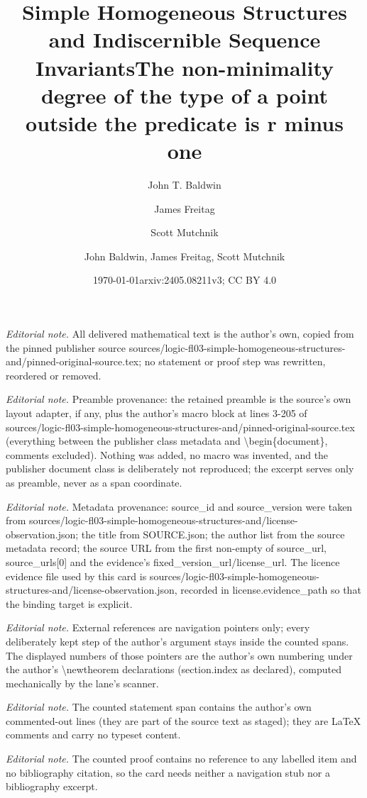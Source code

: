 \documentclass[10pt,a4paper]{amsart}
\title{Simple Homogeneous Structures and Indiscernible Sequence Invariants}
\author[1]{John T. Baldwin}
\author[2]{James Freitag}
\author[3]{Scott Mutchnik}
\date{\today}
\title{The non-minimality degree of the type of a point outside the predicate is r minus one}
\author{John Baldwin, James Freitag, Scott Mutchnik}
\date{arxiv:2405.08211v3; CC BY 4.0}
\theoremstyle{definition}
\theoremstyle{remark}
\numberwithin{equation}{section}
\begin{document}
\maketitle
\noindent\textit{Editorial note.} All delivered mathematical text is the author's own, copied from the pinned publisher source sources/logic-fl03-simple-homogeneous-structures-and/pinned-original-source.tex; no statement or proof step was rewritten, reordered or removed.\par\medskip
\noindent\textit{Editorial note.} Preamble provenance: the retained preamble is the source's own layout adapter, if any, plus the author's macro block at lines 3-205 of sources/logic-fl03-simple-homogeneous-structures-and/pinned-original-source.tex (everything between the publisher class metadata and \textbackslash{}begin\{document\}, comments excluded). Nothing was added, no macro was invented, and the publisher document class is deliberately not reproduced; the excerpt serves only as preamble, never as a span coordinate.\par\medskip
\noindent\textit{Editorial note.} Metadata provenance: source\_id and source\_version were taken from sources/logic-fl03-simple-homogeneous-structures-and/license-observation.json; the title from SOURCE.json; the author list from the source metadata record; the source URL from the first non-empty of source\_url, source\_urls[0] and the evidence's fixed\_version\_url/license\_url. The licence evidence file used by this card is sources/logic-fl03-simple-homogeneous-structures-and/license-observation.json, recorded in license.evidence\_path so that the binding target is explicit.\par\medskip
\noindent\textit{Editorial note.} External references are navigation pointers only; every deliberately kept step of the author's argument stays inside the counted spans. The displayed numbers of those pointers are the author's own numbering under the author's \textbackslash{}newtheorem declarations (section.index as declared), computed mechanically by the lane's scanner.\par\medskip
\noindent\textit{Editorial note.} The counted statement span contains the author's own commented-out lines (they are part of the source text as staged); they are LaTeX comments and carry no typeset content.\par\medskip
\noindent\textit{Editorial note.} The counted proof contains no reference to any labelled item and no bibliography citation, so the card needs neither a navigation stub nor a bibliography excerpt.\par\medskip
\end{document}
